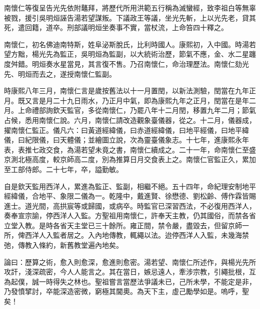 \begin{pinyinscope}
南懷仁等復呈告光先依附鼇拜，將歷代所用洪範五行稱為滅蠻經，致李祖白等無辜被戮，援引吳明烜誣告湯若望謀叛。下議政王等議，坐光先斬，上以光先老，貸其死，遣回籍，道卒。刑部議明烜坐奏事不實，當杖流，上命笞四十釋之。

南懷仁，初名佛迪南特斯，姓阜泌斯脫氏，比利時國人。康熙初，入中國。時湯若望方黜，楊光先為監正，吳明烜為監副，以大統術治歷，節氣不應，金、水二星躔度舛錯。明烜奏水星當見，其言復不售。乃召南懷仁，命治理歷法。南懷仁劾光先、明烜而去之，遂授南懷仁監副。

時康熙八年三月，南懷仁言是歲按舊法以十一月置閏，以新法測驗，閏當在九年正月。既又言是月二十九日雨水，乃正月中氣，即為康熙九年之正月，閏當在是年二月。上命禮部詢欽天監官，多從南懷仁，乃罷八年十二月閏，移置九年二月；節氣占候，悉用南懷仁說。六月，南懷仁請改造觀象臺儀器，從之。十二月，儀器成，擢南懷仁監正。儀凡六：曰黃道經緯儀，曰赤道經緯儀，曰地平經儀，曰地平緯儀，曰紀限儀，曰天體儀；並繪圖立說，次為靈臺儀象志。十七年，進康熙永年表，表推七政交食，為湯若望未竟之書，南懷仁續成之。二十一年，命南懷仁至盛京測北極高度，較京師高二度，別為推算日月交食表上之。南懷仁官監正久，累加至工部侍郎。二十七年，卒，謚勤敏。

自是欽天監用西洋人，累進為監正、監副，相繼不絕。五十四年，命紀理安制地平經緯儀，合地平、象限二儀為一。乾隆中，戴進賢、徐懋德、劉松齡、傅作霖皆賜進士。道光間，高拱宸等或歸國，或病卒。時監官已深習西法，不必復用西洋人，奏奉宣宗諭，停西洋人入監。方聖祖用南懷仁，許奉天主教，仍其國俗，而禁各省立堂入教。是時各省天主堂已三十餘所。雍正間，禁令嚴，盡毀去，但留京師一所，俾西洋人入監者居之。入內地傳教，輒繩以法。迨停西洋人入監，未幾海禁弛，傳教入條約，新舊教堂遍內地矣。

論曰：歷算之術，愈入則愈深，愈進則愈密。湯若望、南懷仁所述作，與楊光先所攻訐，淺深疏密，今人人能言之。其在當日，嫉忌遠人，牽涉宗教，引繩批根，互為起僕，誠一時得失之林也。聖祖嘗言當歷法爭議未已，己所未學，不能定是非，乃發憤揅討，卒能深造密微，窮極其閫奧。為天下主，虛己勵學如是。嗚呼，聖矣！


\end{pinyinscope}